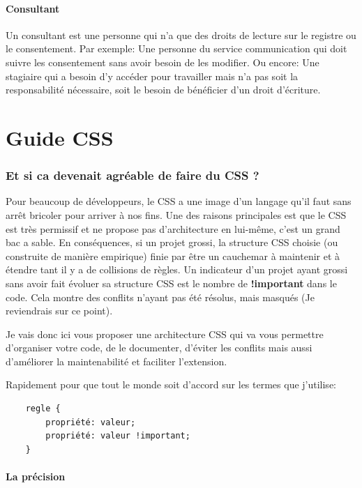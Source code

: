 \documentclass[12pt, a4paper]{report}
\begin{document}
\begin{appendix}
\subsubsection{Consultant}
Un consultant est une personne qui n'a que des droits de lecture sur le registre ou le consentement.\newline
Par exemple: Une personne du service communication qui doit suivre les consentement sans avoir besoin de les modifier.\newline
Ou encore: Une stagiaire qui a besoin d'y accéder pour travailler mais n'a pas soit la responsabilité nécessaire, soit le besoin de bénéficier d'un droit d'écriture.\newline

\chapter{Guide CSS}
\label{appendix:guide}

\subsection{Et si ca devenait agréable de faire du CSS ?}

Pour beaucoup de développeurs, le CSS a une image d'un langage qu'il faut sans arrêt bricoler pour arriver à nos fins.
Une des raisons principales est que le CSS est très permissif et ne propose pas d'architecture en lui-même, c'est un grand bac a sable.
En conséquences, si un projet grossi, la structure CSS choisie (ou construite de manière empirique) finie par être un cauchemar à maintenir et à étendre tant il y a de collisions de règles.
Un indicateur d'un projet ayant grossi sans avoir fait évoluer sa structure CSS est le nombre de \textbf{!important} dans le code. Cela montre des conflits n'ayant pas été résolus, mais masqués (Je reviendrais sur ce point).

Je vais donc ici vous proposer une architecture CSS qui va vous permettre d'organiser votre code, de le documenter, d'éviter les conflits mais aussi d'améliorer la maintenabilité et faciliter l'extension.

Rapidement pour que tout le monde soit d'accord sur les termes que j'utilise:
\begin{lstlisting}
    regle {
        propriété: valeur;
        propriété: valeur !important;
    }
\end{lstlisting}

\subsubsection{La précision}


\end{appendix}
\end{document}
